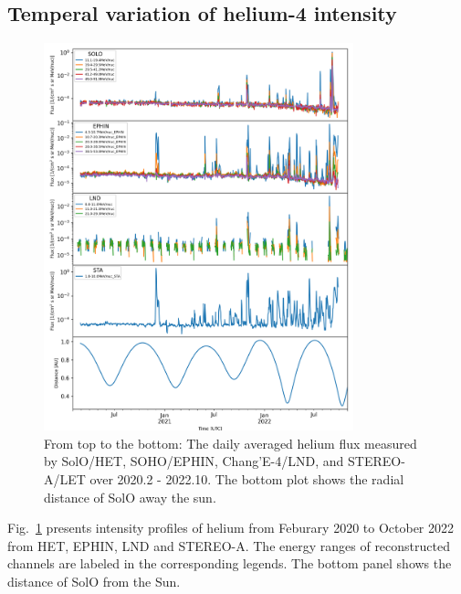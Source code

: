 \subsection*{Temperal variation of helium-4 intensity}


\begin{figure}[!htb]
    \centering
    \includegraphics[width = 0.8\textwidth]{images/ACR/overview_Helium_4_instrument.png}
    \caption[Overview of helium intensities measured by different instruments]{From top to the bottom: The daily averaged helium flux measured by \ac{SolO}/\ac{HET}, \ac{SOHO}/\ac{EPHIN}, Chang'E-4/\ac{LND}, and \ac{STEREO}-A/\ac{LET} over 2020.2 - 2022.10. The bottom plot shows the radial distance of \ac{SolO} away the sun.}
    \label{fig:overview_helium_intensity}
\end{figure}

Fig.~\ref{fig:overview_helium_intensity} presents intensity profiles of helium from Feburary 2020 to October 2022 from \ac{HET}, \ac{EPHIN}, \ac{LND} and \ac{STEREO}-A. The energy ranges of reconstructed channels are labeled in the corresponding legends. The bottom panel shows the distance of \ac{SolO} from the Sun.


